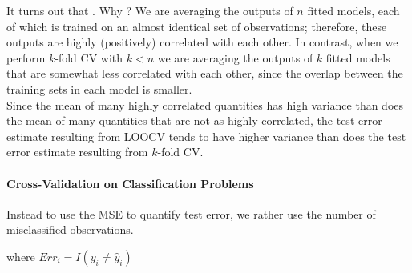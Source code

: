 It turns out that . Why ?
We are averaging the outputs of $n$ fitted models, each of which is 
trained on an almost identical set of observations; therefore, these
outputs are highly (positively) correlated with each other.
In contrast, when we perform $k$-fold CV with $k<n$ we are averaging
the outputs of $k$ fitted models that are somewhat less correlated with
each other, since the overlap between the training sets in each model 
is smaller.\\

Since the mean of many highly correlated quantities has high variance 
than does the mean of many quantities that are not as highly 
correlated, the test error estimate resulting from LOOCV tends to have
higher variance than does the test error estimate resulting from
$k$-fold CV.

\paragraph{Cross-Validation on Classification Problems} Instead to use
the MSE to quantify test error, we rather use the number of 
misclassified observations.
\begin{center}
\end{center}
where $Err_{i}=I(y_{i}\neq\hat{y}_{i})$
